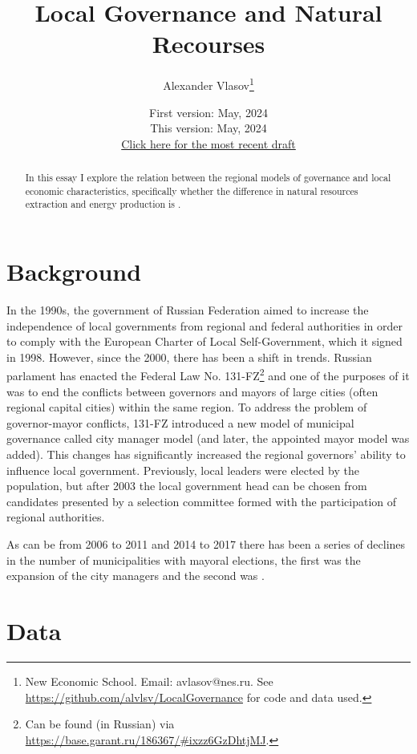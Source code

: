 \documentclass[12pt]{article}
\title{Local Governance and Natural Recourses}
\author{Alexander Vlasov\thanks{New Economic School. Email: avlasov@nes.ru. See \href{https://github.com/alvlsv/LocalGovernance}{https://github.com/alvlsv/LocalGovernance} for code and data used.}}
\date{\normalsize First version: May, 2024\\\vspace{1ex} This version: May, 2024\\ \vspace{1ex}
\href{https:}{Click here for the most recent draft}}
\numberwithin{equation}{section}
\numberwithin{table}{section}
\numberwithin{figure}{section}
\begin{document}
\maketitle
\begin{abstract}
    In this essay I explore the relation between the regional models of governance and local economic characteristics, specifically whether the difference in natural resources extraction and energy production is .
\end{abstract}


\section{Background}

In the 1990s, the government of Russian Federation aimed to increase the independence of local governments from regional and federal authorities in order to comply with the European Charter of Local Self-Government, which it signed in 1998.
However, since the 2000, there has been a shift in trends. 
Russian parlament has enacted the Federal Law No. 131-FZ\footnote{Can be found (in Russian) via \url{https://base.garant.ru/186367/\#ixzz6GzDhtjMJ}.} and one of the purposes of it was to end the conflicts between governors and mayors of large cities (often regional capital cities) within the same region.
To address the problem of governor-mayor conflicts, 131-FZ introduced a new model of municipal governance called city manager model (and later, the appointed mayor model was added). This changes has significantly increased the regional governors' ability to influence local government.
Previously, local leaders were elected by the population, but after 2003 the local government head can be chosen from candidates presented by a selection committee formed with the participation of regional authorities.

As can be  from 2006 to 2011 and 2014 to 2017 there has been a series of declines in the number of municipalities with mayoral elections, the first was the expansion of the city managers and the second was . 

\section{Data}
\end{document}
